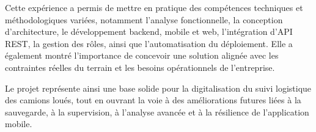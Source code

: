 Cette expérience a permis de mettre en pratique des compétences techniques et méthodologiques variées, notamment l'analyse fonctionnelle, la conception d'architecture, le développement backend, mobile et web, l'intégration d'API REST, la gestion des rôles, ainsi que l'automatisation du déploiement. Elle a également montré l'importance de concevoir une solution alignée avec les contraintes réelles du terrain et les besoins opérationnels de l'entreprise.

Le projet représente ainsi une base solide pour la digitalisation du suivi logistique des camions loués, tout en ouvrant la voie à des améliorations futures liées à la sauvegarde, à la supervision, à l'analyse avancée et à la résilience de l'application mobile.
